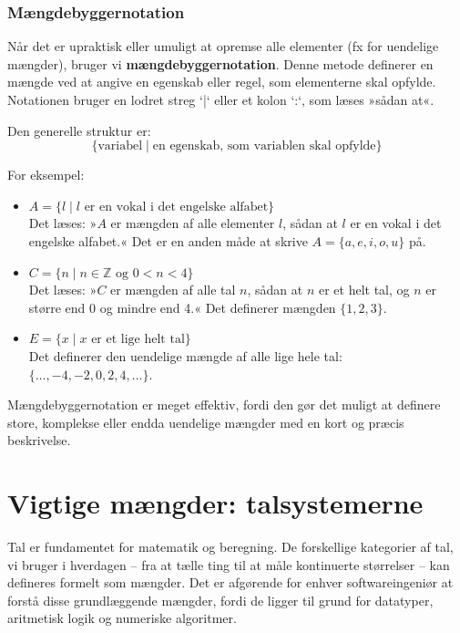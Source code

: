 \subsubsection*{Mængdebyggernotation}
Når det er upraktisk eller umuligt at opremse alle elementer (fx for uendelige mængder), bruger vi \textbf{mængdebyggernotation}. Denne metode definerer en mængde ved at angive en egenskab eller regel, som elementerne skal opfylde. Notationen bruger en lodret streg `|` eller et kolon `:`, som læses »sådan at«.

Den generelle struktur er:
\[ \{ \text{variabel} \mid \text{en egenskab, som variablen skal opfylde} \} \]

For eksempel:
\begin{itemize}
    \item $A = \{ l \mid l \text{ er en vokal i det engelske alfabet} \}$ \\
    Det læses: »$A$ er mængden af alle elementer $l$, sådan at $l$ er en vokal i det engelske alfabet.« Det er en anden måde at skrive $A = \{a, e, i, o, u\}$ på.
    
    \item $C = \{ n \mid n \in \mathbb{Z} \text{ og } 0 < n < 4 \}$ \\
    Det læses: »$C$ er mængden af alle tal $n$, sådan at $n$ er et helt tal, og $n$ er større end 0 og mindre end 4.« Det definerer mængden $\{1, 2, 3\}$.
    
    \item $E = \{ x \mid x \text{ er et lige helt tal} \}$ \\
    Det definerer den uendelige mængde af alle lige hele tal: $\{\dots, -4, -2, 0, 2, 4, \dots\}$.
\end{itemize}

Mængdebyggernotation er meget effektiv, fordi den gør det muligt at definere store, komplekse eller endda uendelige mængder med en kort og præcis beskrivelse.

\section{Vigtige mængder: talsystemerne}
Tal er fundamentet for matematik og beregning. De forskellige kategorier af tal, vi bruger i hverdagen -- fra at tælle ting til at måle kontinuerte størrelser -- kan defineres formelt som mængder. Det er afgørende for enhver softwareingeniør at forstå disse grundlæggende mængder, fordi de ligger til grund for datatyper, aritmetisk logik og numeriske algoritmer.

